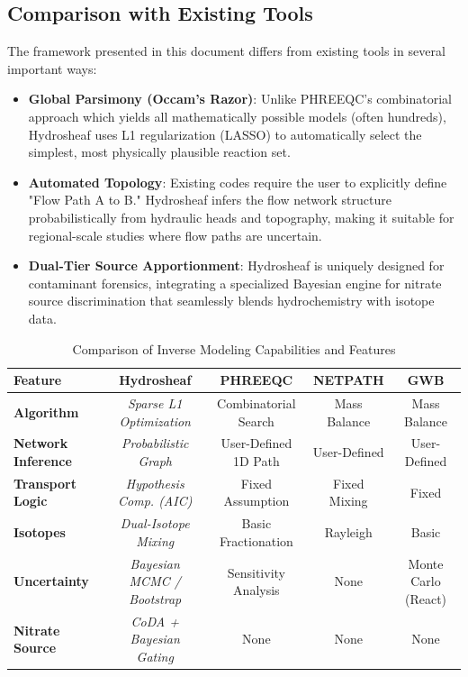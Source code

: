 \documentclass[12pt,a4paper]{article}
\theoremstyle{plain}
\theoremstyle{definition}
\theoremstyle{remark}
\begin{document}
\subsection{Comparison with Existing Tools}\label{sec:comparison}
The framework presented in this document differs from existing tools in several important ways:

\begin{itemize}
	\item \textbf{Global Parsimony (Occam's Razor)}: Unlike PHREEQC's combinatorial approach which yields all mathematically possible models (often hundreds), Hydrosheaf uses L1 regularization (LASSO) to automatically select the simplest, most physically plausible reaction set.
	\item \textbf{Automated Topology}: Existing codes require the user to explicitly define "Flow Path A to B." Hydrosheaf infers the flow network structure probabilistically from hydraulic heads and topography, making it suitable for regional-scale studies where flow paths are uncertain.
	\item \textbf{Dual-Tier Source Apportionment}: Hydrosheaf is uniquely designed for contaminant forensics, integrating a specialized Bayesian engine for nitrate source discrimination that seamlessly blends hydrochemistry with isotope data.
\end{itemize}

\begin{table}[htbp]
	\centering
	\caption{Comparison of Inverse Modeling Capabilities and Features}
	\label{tab:software_comparison}
	\begin{tabularx}{\textwidth}{@{} l C C C C @{}}
		\toprule
		\textbf{Feature}           & \textbf{Hydrosheaf}                & \textbf{PHREEQC}     & \textbf{NETPATH} & \textbf{GWB}        \\
		\midrule
		\textbf{Algorithm}         & \textit{Sparse L1 Optimization}    & Combinatorial Search & Mass Balance     & Mass Balance        \\ \addlinespace
		\textbf{Network Inference} & \textit{Probabilistic Graph}       & User-Defined 1D Path & User-Defined     & User-Defined        \\ \addlinespace
		\textbf{Transport Logic}   & \textit{Hypothesis Comp. (AIC)}    & Fixed Assumption     & Fixed Mixing     & Fixed               \\ \addlinespace
		\textbf{Isotopes}          & \textit{Dual-Isotope Mixing}       & Basic Fractionation  & Rayleigh         & Basic               \\ \addlinespace
		\textbf{Uncertainty}       & \textit{Bayesian MCMC / Bootstrap} & Sensitivity Analysis & None             & Monte Carlo (React) \\ \addlinespace
		\textbf{Nitrate Source}    & \textit{CoDA + Bayesian Gating}    & None                 & None             & None                \\
		\bottomrule
	\end{tabularx}
\end{table}
\end{document}
